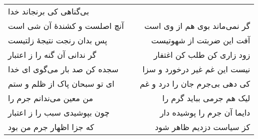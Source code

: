 \begin{center}
\begin{longtable}{l p{0.5cm} r}
بی‌گناهی کی برنجاند خدا
\\
آنچ اصلست و کشندهٔ آن شی است
&&
گر نمی‌ماند بوی هم از وی است
\\
پس بدان رنجت نتیجهٔ زلتیست
&&
آفت این ضربتت از شهوتیست
\\
گر ندانی آن گنه را ز اعتبار
&&
زود زاری کن طلب کن اغتفار
\\
سجده کن صد بار می‌گوی ای خدا
&&
نیست این غم غیر درخورد و سزا
\\
ای تو سبحان پاک از ظلم و ستم
&&
کی دهی بی‌جرم جان را درد و غم
\\
من معین می‌ندانم جرم را
&&
لیک هم جرمی بباید گرم را
\\
چون بپوشیدی سبب را ز اعتبار
&&
دایما آن جرم را پوشیده دار
\\
که جزا اظهار جرم من بود
&&
کز سیاست دزدیم ظاهر شود
\\
\end{longtable}
\end{center}
